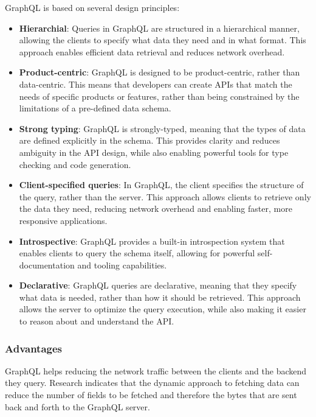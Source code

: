 GraphQL is based on several design principles: \cite{misc:-:background:graphql:graphql-specification}

\begin{itemize}
  \item \textbf{Hierarchial}: Queries in GraphQL are structured in a hierarchical manner, allowing the clients to specify what data they need and in what format. This approach enables efficient data retrieval and reduces network overhead.

  \item \textbf{Product-centric}: GraphQL is designed to be product-centric, rather than data-centric. This means that developers can create APIs that match the needs of specific products or features, rather than being constrained by the limitations of a pre-defined data schema.

  \item \textbf{Strong typing}: GraphQL is strongly-typed, meaning that the types of data are defined explicitly in the schema. This provides clarity and reduces ambiguity in the API design, while also enabling powerful tools for type checking and code generation.

  \item \textbf{Client-specified queries}: In GraphQL, the client specifies the structure of the query, rather than the server. This approach allows clients to retrieve only the data they need, reducing network overhead and enabling faster, more responsive applications.

  \item \textbf{Introspective}: GraphQL provides a built-in introspection system that enables clients to query the schema itself, allowing for powerful self-documentation and tooling capabilities.

  \item \textbf{Declarative}: GraphQL queries are declarative, meaning that they specify what data is needed, rather than how it should be retrieved. This approach allows the server to optimize the query execution, while also making it easier to reason about and understand the API.
\end{itemize}

\subsubsection{Advantages}

GraphQL helps reducing the network traffic between the clients and the backend they query. Research indicates that the dynamic approach to fetching data can reduce the number of fields to be fetched and therefore the bytes that are sent back and forth to the GraphQL server. \cite{inprocessdings:2019:background:graphql:migration-to-graphql}

